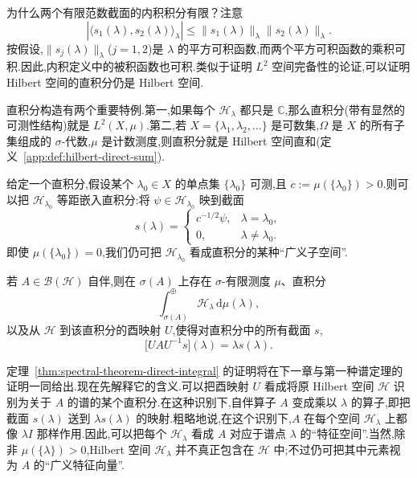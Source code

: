 {为什么两个有限范数截面的内积积分有限？注意
\[
|\langle s_{1}(\lambda),s_{2}(\lambda)\rangle_{\lambda}|
\leq\|s_{1}(\lambda)\|_{\lambda}\|s_{2}(\lambda)\|_{\lambda}.
\]
按假设,\(\|s_{j}(\lambda)\|_{\lambda}\)(\(j=1,2\))是 \(\lambda\) 的平方可积函数,而两个平方可积函数的乘积可积.因此,内积定义中的被积函数也可积.类似于证明 \(L^{2}\) 空间完备性的论证,可以证明 Hilbert 空间的直积分仍是 Hilbert 空间.

直积分构造有两个重要特例.第一,如果每个 \(\mathcal{H}_{\lambda}\) 都只是 \(\mathbb{C}\),那么直积分(带有显然的可测性结构)就是 \(L^{2}(X,\mu)\).第二,若 \(X=\{\lambda_{1},\lambda_{2},\ldots\}\) 是可数集,\(\Omega\) 是 \(X\) 的所有子集组成的 \(\sigma\)-代数,\(\mu\) 是计数测度,则直积分就是 Hilbert 空间直和(定义~\ref{app:def:hilbert-direct-sum}).

给定一个直积分,假设某个 \(\lambda_{0}\in X\) 的单点集 \(\{\lambda_{0}\}\) 可测,且 \(c:=\mu(\{\lambda_{0}\})>0\).则可以把 \(\mathcal{H}_{\lambda_{0}}\) 等距嵌入直积分:将 \(\psi\in\mathcal{H}_{\lambda_{0}}\) 映到截面
\[
s(\lambda)=
\begin{cases}
c^{-1/2}\psi,&\lambda=\lambda_{0},\\
0,&\lambda\neq\lambda_{0}.
\end{cases}
\]
即使 \(\mu(\{\lambda_{0}\})=0\),我们仍可把 \(\mathcal{H}_{\lambda_{0}}\) 看成直积分的某种“广义子空间”.

\begin{theorem}\label{thm:spectral-theorem-direct-integral}
若 \(A\in\mathcal{B}(\mathcal{H})\) 自伴,则在 \(\sigma(A)\) 上存在 \(\sigma\)-有限测度 \(\mu\)、直积分
\[
\int_{\sigma(A)}^{\oplus}\mathcal{H}_{\lambda}\,\mathrm{d}\mu(\lambda),
\]
以及从 \(\mathcal{H}\) 到该直积分的酉映射 \(U\),使得对直积分中的所有截面 \(s\),
\[
\bigl[UAU^{-1}s\bigr](\lambda)=\lambda s(\lambda).
\label{eq:spectral-theorem-direct-integral}
\]
\end{theorem}

定理~\ref{thm:spectral-theorem-direct-integral} 的证明将在下一章与第一种谱定理的证明一同给出.现在先解释它的含义.可以把酉映射 \(U\) 看成将原 Hilbert 空间 \(\mathcal{H}\) 识别为关于 \(A\) 的谱的某个直积分.在这种识别下,自伴算子 \(A\) 变成乘以 \(\lambda\) 的算子,即把截面 \(s(\lambda)\) 送到 \(\lambda s(\lambda)\) 的映射.粗略地说,在这个识别下,\(A\) 在每个空间 \(\mathcal{H}_{\lambda}\) 上都像 \(\lambda I\) 那样作用.因此,可以把每个 \(\mathcal{H}_{\lambda}\) 看成 \(A\) 对应于谱点 \(\lambda\) 的“特征空间”.当然,除非 \(\mu(\{\lambda\})>0\),Hilbert 空间 \(\mathcal{H}_{\lambda}\) 并不真正包含在 \(\mathcal{H}\) 中;不过仍可把其中元素视为 \(A\) 的“广义特征向量”.

}

